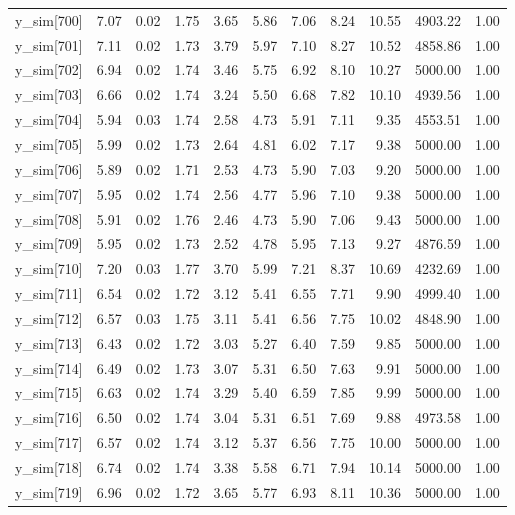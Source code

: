 \begin{table}[ht]
\begin{tabular}{rrrrrrrrrrr}
  y\_sim[700] & 7.07 & 0.02 & 1.75 & 3.65 & 5.86 & 7.06 & 8.24 & 10.55 & 4903.22 & 1.00 \\ 
  y\_sim[701] & 7.11 & 0.02 & 1.73 & 3.79 & 5.97 & 7.10 & 8.27 & 10.52 & 4858.86 & 1.00 \\ 
  y\_sim[702] & 6.94 & 0.02 & 1.74 & 3.46 & 5.75 & 6.92 & 8.10 & 10.27 & 5000.00 & 1.00 \\ 
  y\_sim[703] & 6.66 & 0.02 & 1.74 & 3.24 & 5.50 & 6.68 & 7.82 & 10.10 & 4939.56 & 1.00 \\ 
  y\_sim[704] & 5.94 & 0.03 & 1.74 & 2.58 & 4.73 & 5.91 & 7.11 & 9.35 & 4553.51 & 1.00 \\ 
  y\_sim[705] & 5.99 & 0.02 & 1.73 & 2.64 & 4.81 & 6.02 & 7.17 & 9.38 & 5000.00 & 1.00 \\ 
  y\_sim[706] & 5.89 & 0.02 & 1.71 & 2.53 & 4.73 & 5.90 & 7.03 & 9.20 & 5000.00 & 1.00 \\ 
  y\_sim[707] & 5.95 & 0.02 & 1.74 & 2.56 & 4.77 & 5.96 & 7.10 & 9.38 & 5000.00 & 1.00 \\ 
  y\_sim[708] & 5.91 & 0.02 & 1.76 & 2.46 & 4.73 & 5.90 & 7.06 & 9.43 & 5000.00 & 1.00 \\ 
  y\_sim[709] & 5.95 & 0.02 & 1.73 & 2.52 & 4.78 & 5.95 & 7.13 & 9.27 & 4876.59 & 1.00 \\ 
  y\_sim[710] & 7.20 & 0.03 & 1.77 & 3.70 & 5.99 & 7.21 & 8.37 & 10.69 & 4232.69 & 1.00 \\ 
  y\_sim[711] & 6.54 & 0.02 & 1.72 & 3.12 & 5.41 & 6.55 & 7.71 & 9.90 & 4999.40 & 1.00 \\ 
  y\_sim[712] & 6.57 & 0.03 & 1.75 & 3.11 & 5.41 & 6.56 & 7.75 & 10.02 & 4848.90 & 1.00 \\ 
  y\_sim[713] & 6.43 & 0.02 & 1.72 & 3.03 & 5.27 & 6.40 & 7.59 & 9.85 & 5000.00 & 1.00 \\ 
  y\_sim[714] & 6.49 & 0.02 & 1.73 & 3.07 & 5.31 & 6.50 & 7.63 & 9.91 & 5000.00 & 1.00 \\ 
  y\_sim[715] & 6.63 & 0.02 & 1.74 & 3.29 & 5.40 & 6.59 & 7.85 & 9.99 & 5000.00 & 1.00 \\ 
  y\_sim[716] & 6.50 & 0.02 & 1.74 & 3.04 & 5.31 & 6.51 & 7.69 & 9.88 & 4973.58 & 1.00 \\ 
  y\_sim[717] & 6.57 & 0.02 & 1.74 & 3.12 & 5.37 & 6.56 & 7.75 & 10.00 & 5000.00 & 1.00 \\ 
  y\_sim[718] & 6.74 & 0.02 & 1.74 & 3.38 & 5.58 & 6.71 & 7.94 & 10.14 & 5000.00 & 1.00 \\ 
  y\_sim[719] & 6.96 & 0.02 & 1.72 & 3.65 & 5.77 & 6.93 & 8.11 & 10.36 & 5000.00 & 1.00 \\ 

\end{tabular}
\end{table}
